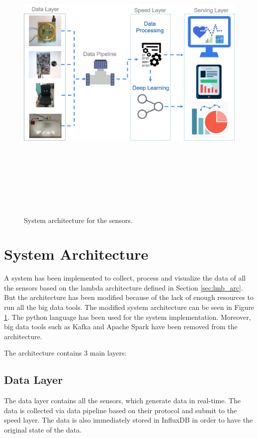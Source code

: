 \begin{figure}[h]
	\centering
	\includegraphics[width=16cm,height=15cm,keepaspectratio=true]{images/sys_arc}
	\caption{
		System architecture for the sensors.
	}
	\label{fig:sys_arc}
\end{figure}

\section{System Architecture}
A system has been implemented to collect, process and visualize the data of all the sensors based on the lambda architecture defined in Section \ref{sec:lmb_arc}. But the architecture has been modified because of the lack of enough resources to run all the big data tools. The modified system architecture can be seen in Figure \ref{fig:sys_arc}. The python language has been used for the system implementation. Moreover, big data tools such as Kafka and Apache Spark have been removed from the architecture.

The architecture contains 3 main layers:

\subsection{Data Layer}
The data layer contains all the sensors, which generate data in real-time. The data is collected via data pipeline based on their protocol and submit to the speed layer. The data is also immediately stored in InfluxDB in order to have the original state of the data.

